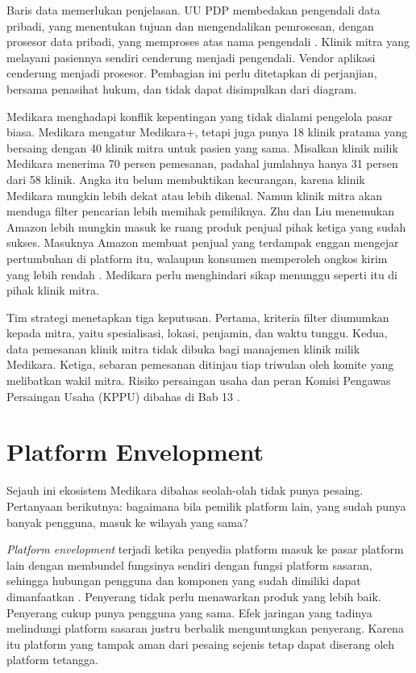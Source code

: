 Baris data memerlukan penjelasan. UU PDP membedakan pengendali data pribadi, yang menentukan tujuan dan
mengendalikan pemrosesan, dengan prosesor data pribadi, yang memproses atas nama pengendali
\cite{uu27-2022-pdp}. Klinik mitra yang melayani pasiennya sendiri cenderung menjadi pengendali. Vendor
aplikasi cenderung menjadi prosesor. Pembagian ini perlu ditetapkan di perjanjian, bersama penasihat
hukum, dan tidak dapat disimpulkan dari diagram.

\begin{kasus}[title={Kasus Medikara Health: Wasit yang Merangkap Pemain}]
Medikara menghadapi konflik kepentingan yang tidak dialami pengelola pasar biasa. Medikara mengatur
Medikara+, tetapi juga punya 18 klinik pratama yang bersaing dengan 40 klinik mitra untuk pasien yang sama. Misalkan klinik milik Medikara menerima 70 persen pemesanan, padahal jumlahnya hanya 31 persen dari 58
klinik. Angka itu belum membuktikan kecurangan, karena klinik Medikara mungkin lebih dekat atau lebih
dikenal. Namun klinik mitra akan menduga filter pencarian lebih memihak pemiliknya. Zhu dan Liu menemukan
Amazon lebih mungkin masuk ke ruang produk penjual pihak ketiga yang sudah sukses. Masuknya Amazon membuat
penjual yang terdampak enggan mengejar pertumbuhan di platform itu, walaupun konsumen memperoleh ongkos
kirim yang lebih rendah \cite{c03-zhu2018competing}. Medikara perlu menghindari sikap menunggu seperti itu
di pihak klinik mitra.

Tim strategi menetapkan tiga keputusan. Pertama, kriteria filter diumumkan kepada mitra, yaitu
spesialisasi, lokasi, penjamin, dan waktu tunggu. Kedua, data pemesanan klinik mitra tidak dibuka bagi
manajemen klinik milik Medikara. Ketiga, sebaran pemesanan ditinjau tiap triwulan oleh komite yang
melibatkan wakil mitra. Risiko persaingan usaha dan peran Komisi Pengawas Persaingan Usaha (KPPU) dibahas
di Bab 13 \cite{uu5-1999-persaingan}.
\end{kasus}

\section{Platform Envelopment}

Sejauh ini ekosistem Medikara dibahas seolah-olah tidak punya pesaing. Pertanyaan berikutnya: bagaimana
bila pemilik platform lain, yang sudah punya banyak pengguna, masuk ke wilayah yang sama?

\textit{Platform envelopment} terjadi ketika penyedia platform masuk ke pasar platform lain dengan
membundel fungsinya sendiri dengan fungsi platform sasaran, sehingga hubungan pengguna dan komponen yang
sudah dimiliki dapat dimanfaatkan \cite{eisenmann2011envelopment}. Penyerang tidak perlu menawarkan produk
yang lebih baik. Penyerang cukup punya pengguna yang sama. Efek jaringan yang tadinya melindungi platform
sasaran justru berbalik menguntungkan penyerang. Karena itu platform yang tampak aman dari pesaing sejenis
tetap dapat diserang oleh platform tetangga.

